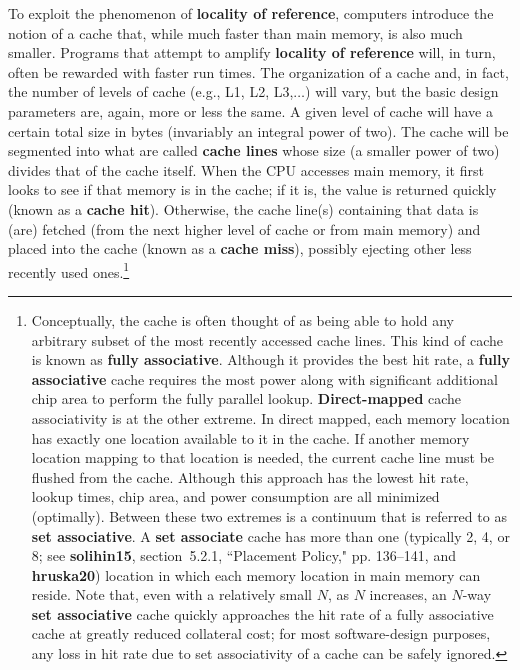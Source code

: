 To exploit the phenomenon of \textbf{locality of reference}, computers
introduce the notion of a cache that, while much faster than main
memory, is also much smaller. Programs that attempt to amplify
\textbf{locality of reference} will, in turn, often be rewarded with
faster run times. The organization of a cache and, in fact, the number of
levels of cache (e.g., L1, L2, L3,$\ldots$) will vary, but the basic
design parameters are, again, more or less the same. A given level of
cache will have a certain total size in bytes (invariably an integral
power of two). The cache will be segmented into what are called
\textbf{cache lines} whose size (a smaller power of two) divides that of
the cache itself. When the CPU accesses main memory, it first looks to
see if that memory is in the cache; if it is, the value is returned
quickly (known as a \textbf{cache hit}). Otherwise, the cache line(s)
containing that data is (are) fetched (from the next higher level of cache
or from main memory) and placed into the cache (known as a \textbf{cache
miss}), possibly ejecting other less recently used
ones.{\cprotect\footnote{Conceptually, the cache is often thought of as
being able to hold any arbitrary subset of the most recently accessed
cache lines. This kind of cache is known as \textbf{fully
associative}. Although it provides the best hit rate, a \textbf{fully
associative} cache requires the most power along with significant
additional chip area to perform the fully parallel lookup. \textbf{Direct-mapped} cache associativity is at the
other extreme. In direct mapped, each memory location has exactly one location
available to it in the cache. If another memory location mapping to
that location is needed, the current cache line must be flushed from
the cache. Although this approach has the lowest hit rate, lookup
times, chip area, and power consumption are all minimized (optimally).
Between these two extremes is a continuum that is referred to as
\textbf{set associative}. A \textbf{set associate} cache has more than
  one (typically 2, 4, or 8; see \textbf{solihin15}, section~5.2.1, ``Placement Policy," pp. 136--141, and \textbf{hruska20})
  location in which each memory location in main memory can reside.
  Note that, even with a relatively small $N$, as $N$ increases, an $N$-way
  \textbf{set associative} cache quickly approaches the hit rate of a fully
  associative cache at greatly reduced collateral cost; for most
  software-design purposes, any loss in hit rate due to set
  associativity of a cache can be safely ignored.}}


